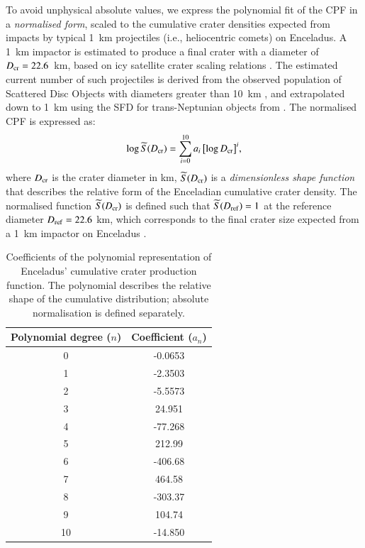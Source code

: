 \documentclass[preprint,11pt,3p,times,authoryear]{elsarticle}
\begin{document}
To avoid unphysical absolute values, we express the polynomial fit of the CPF in a \emph{normalised form}, scaled to the cumulative crater densities expected from impacts by typical 1~km projectiles (i.e., heliocentric comets) on Enceladus. A 1~km impactor is estimated to produce a final crater with a diameter of $D_{\rm cr} = 22.6$~km, based on icy satellite crater scaling relations \citep[e.g.,][]{Zahnle2003}. The estimated current number of such projectiles is derived from the observed population of Scattered Disc Objects with diameters greater than 10~km \citep[$(2.0 \pm 0.8) \times 10^{7}$;][]{Nesvorny2019}, and extrapolated down to 1~km using the SFD for trans-Neptunian objects from \citet{Singer2019}.
The normalised CPF is expressed as:
\begin{equation}
    \log \widetilde{S}(D_{\rm cr}) = \sum_{i=0}^{10} a_i \, \bigl[\log D_{\rm cr}\bigr]^i,
    \label{equ:cpf_scale}
\end{equation}
where $D_{\rm cr}$ is the crater diameter in km, $\widetilde{S}(D_{\rm cr})$ is a \emph{dimensionless shape function} that describes the relative form of the Enceladian cumulative crater density. The normalised function $\widetilde{S}(D_{\rm cr})$ is defined such that $\widetilde{S}(D_{\rm ref}) = 1$ at the reference diameter $D_{\rm ref} = 22.6$ km, which corresponds to the final crater size expected from a 1~km impactor on Enceladus \citep{Zahnle2003,Wong2023}. \\

\begin{table}[t]%
\centering
\begin{tabular}{cc}
\hline
  \textbf{Polynomial degree ($n$)} & \textbf{Coefficient ($a_n$)} \\
\hline
0 & -0.0653  \\
1 & -2.3503 \\
2 & -5.5573 \\
3 & 24.951  \\
4 & -77.268 \\
5 & 212.99  \\
6 & -406.68 \\
7 & 464.58  \\
8 & -303.37 \\
9 & 104.74  \\
10 & -14.850 \\
\hline
\end{tabular}
\caption{Coefficients of the polynomial representation of Enceladus’ cumulative crater production function. The polynomial describes the relative shape of the cumulative distribution; absolute normalisation is defined separately.}
\label{tab:cpf}
\end{table}
\end{document}
